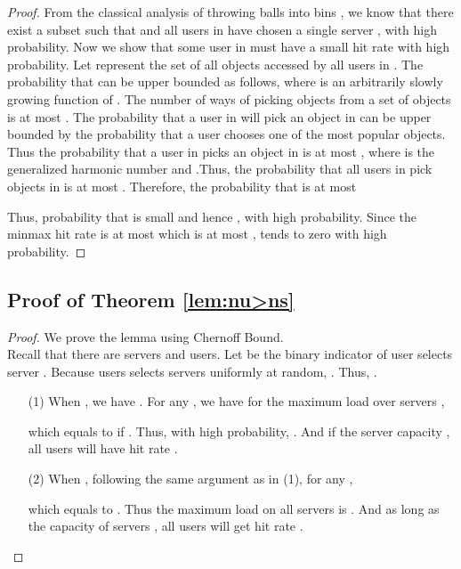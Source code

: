 \documentclass[conference]{IEEEtran}
\begin{document}
\begin{proof}
From the classical analysis of throwing  balls into  bins \cite{mitzenmacherRS2001}, we know that there exist a subset  such that   and all users in  have chosen a single server , with high probability. Now we show that some user in  must have a small hit rate with high probability. Let  represent the set of all objects accessed by all users in . The probability that  can be upper bounded as follows, where  is an arbitrarily slowly growing function of . The number of ways of picking  objects from a set  of  objects is at most . The probability that a user  in  will pick an object in  can be upper bounded by the probability that a user chooses one of the  most popular objects. Thus the probability that a user in  picks an object in   is at most , where  is the  generalized harmonic number and .Thus, the probability that all users in  pick objects in   is at most .  Therefore, the probability that  is at most

Thus, probability that  is small and hence , with high probability. Since the minmax hit rate  is at most  which is at most ,  tends to zero with high probability.
\end{proof}





\subsection{Proof of Theorem \ref{lem:nu>ns}}
\begin{proof}
We prove the lemma using Chernoff Bound. \\
Recall that there are  servers and  users. Let  be the binary indicator of user  selects server . Because users selects servers uniformly at random, . Thus, .
\begin{enumerate}
\item [(1)] When , we have . For any , we have for the maximum load over servers ,

which equals to  if . Thus, with high probability, . And if the server capacity , all users will have hit rate .
\item [(2)] When , following the same argument as in (1), for any ,

which equals to . Thus the maximum load on all servers is . And as long as the capacity of servers , all users will get hit rate .
\end{enumerate}
\end{proof}
\end{document}
